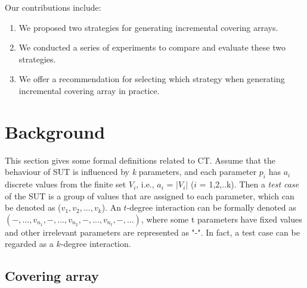 \documentclass[conference]{IEEEtran}
\theoremstyle{definition}
\begin{document}
%


%
%
%
%
Our contributions include:

 \begin{enumerate}
 \item  We proposed two strategies for generating incremental covering arrays.
 \item  We conducted a series of experiments to compare and evaluate these two strategies.
 \item  We offer a recommendation for selecting which strategy when generating incremental covering array in practice.
\end{enumerate}
%

\section{Background}
This section gives some formal definitions related to CT. Assume that the behaviour of SUT is influenced by \emph{k} parameters, and each parameter $p_{i}$ has $a_{i}$ discrete values from the finite set $V_{i}$, i.e., $a_{i}$ = $|V_{i}|$ ($i$ = 1,2,..k). Then a \emph{test case} of the SUT is a group of values that are assigned to each parameter, which can be denoted as ($v_{1}, v_{2}, ..., v_{k}$). An $t$-degree interaction can be formally denoted as $(-, ..., v_{n_{1}}, -, ..., v_{n_{2}},-, ...,v_{n_{t}}, -, ...)$, where some t parameters have fixed values and other irrelevant parameters are represented as "-". In fact, a test case can be regarded as a $k$-degree interaction.


\subsection{Covering array}
\end{document}
